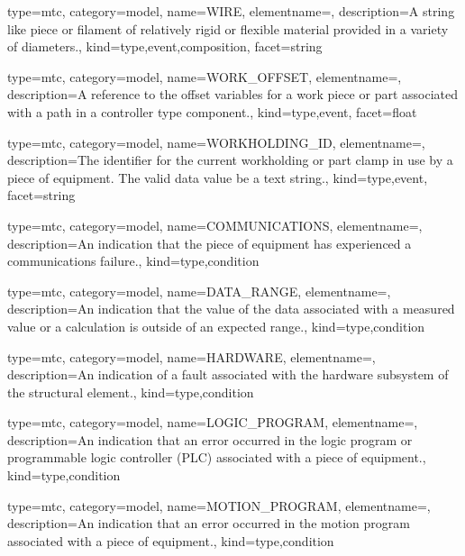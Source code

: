 {
  type=mtc,
  category=model,
  name={WIRE},
  elementname=,
  description={A string like piece or filament of relatively rigid or flexible material provided in a variety of diameters.},
  kind={type,event,composition},
  facet={\gls{string}}
}


{
  type=mtc,
  category=model,
  name={WORK\_OFFSET},
  elementname=,
  description={A reference to the offset variables for a work piece or part associated with a \gls{path} in a \gls{controller} type component.},
  kind={type,event},
  facet={\gls{float}}
}


{
  type=mtc,
  category=model,
  name={WORKHOLDING\_ID},
  elementname=,
  description={The identifier for the current workholding or part clamp in use by a piece of equipment. \newline The \gls{valid data value} \must be a text string.},
  kind={type,event},
  facet={\gls{string}}
}



{
  type=mtc,
  category=model,
  name={COMMUNICATIONS},
  elementname=,
  description={An indication that the piece of equipment has experienced a communications failure.},
  kind={type,condition}
}


{
  type=mtc,
  category=model,
  name={DATA\_RANGE},
  elementname=,
  description={An indication that the value of the data associated with a measured value or a calculation is outside of an expected range.},
  kind={type,condition}
}



{
  type=mtc,
  category=model,
  name={HARDWARE},
  elementname=,
  description={An indication of a fault associated with the hardware subsystem of the \gls{structural element}.},
  kind={type,condition}
}


{
  type=mtc,
  category=model,
  name={LOGIC\_PROGRAM},
  elementname=,
  description={An indication that an error occurred in the logic program or programmable logic controller (PLC) associated with a piece of equipment.},
  kind={type,condition}
}


{
  type=mtc,
  category=model,
  name={MOTION\_PROGRAM},
  elementname=,
  description={An indication that an error occurred in the motion program associated with a piece of equipment.},
  kind={type,condition}
}


